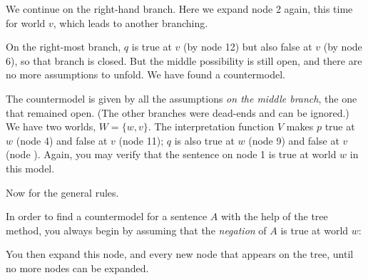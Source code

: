 We continue on the right-hand branch. Here we expand node 2 again, this time for
world $v$, which leads to another branching.

\begin{center}
\end{center}
%
On the right-most branch, $q$ is true at $v$ (by node 12) but also false at $v$
(by node 6), so that branch is closed. But the middle possibility is still open,
and there are no more assumptions to unfold. We have found a countermodel.

The countermodel is given by all the assumptions \emph{on the middle branch},
the one that remained open. (The other branches were dead-ends and can be
ignored.) We have two worlds, $W = \{ w,v \}$. The interpretation function $V$
makes $p$ true at $w$ (node 4) and false at $v$ (node 11); $q$ is also true at
$w$ (node 9) and false at $v$ (node ). Again, you may verify that the sentence
on node 1 is true at world $w$ in this model.

Now for the general rules.

In order to find a countermodel for a sentence $A$ with the help of the tree
method, you always begin by assuming that the \emph{negation} of $A$ is true at
world $w$:
%
\begin{center}
\end{center}
%
You then expand this node, and every new node that appears on the tree, until no
more nodes can be expanded.

